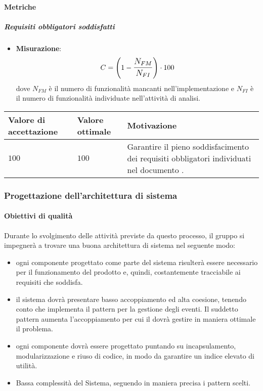 \paragraph{Metriche}
\subparagraph{Requisiti obbligatori soddisfatti}

\begin{itemize}
\item \textbf{Misurazione}: 
		$$C=\left(1-\mathlarger{\frac{N_{FM}}{N_{FI}}}\right) \cdot 100$$ 
	dove $N_{FM}$ è il numero di funzionalità mancanti nell'implementazione e $N_{FI}$ è il numero di funzionalità individuate nell'attività di analisi. 
\end{itemize}
	
\begin{center}
	\begin{tabular}{|P{2.5cm}|P{2.5cm}|P{6cm}|}
		\hline
			\textbf{Valore di accettazione}	& \textbf{Valore ottimale} & \textbf{Motivazione} \\
			\hline
			$100$ & $100$ & Garantire il pieno soddisfacimento dei requisiti obbligatori individuati nel documento \AdR. \\
			\hline
			\end{tabular}
\end{center}	

\subsubsection{Progettazione dell'architettura di sistema}

\paragraph{Obiettivi di qualità}
Durante lo svolgimento delle attività previste da questo processo, il gruppo si impegnerà a trovare una buona architettura di sistema nel seguente modo:
\begin{itemize}
\item ogni componente progettato come parte del sistema risulterà essere necessario per il funzionamento del prodotto e, quindi, costantemente tracciabile ai requisiti che soddisfa.
\item il sistema dovrà presentare basso accoppiamento ed alta coesione, tenendo conto che  implementa il pattern  per la gestione degli eventi. Il suddetto pattern aumenta l'accoppiamento per cui il  dovrà gestire in maniera ottimale il problema.
\item ogni componente dovrà essere progettato puntando su incapsulamento, modularizzazione e riuso di codice, in modo da garantire un indice elevato di utilità.
\item Bassa complessità del Sistema, seguendo in maniera precisa i pattern scelti.
\end{itemize}

